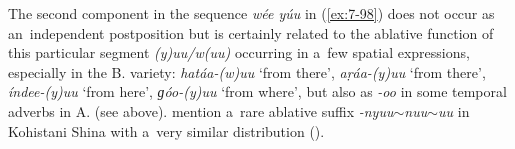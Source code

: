 The second component in the sequence \textit{wée yúu} in (\ref{ex:7-98}) does not occur as an~independent postposition but is certainly related to the ablative function of this particular segment \textit{(y)uu/w(uu)} occurring in a~few spatial expressions, especially in the B. variety: \textit{hatáa-(w)uu} `from there', \textit{aṛáa-(y)uu} `from there', \textit{índee-(y)uu} `from here', \textit{ɡóo-(y)uu} `from where', but also as \textit{-oo} in some temporal adverbs in A. (see  above). \citeauthor{schmidtkohistani2001} mention a~rare ablative suffix \textit{-nyuu$\sim$nuu$\sim$uu} in Kohistani Shina with a~very similar distribution (\citeyear[130]{schmidtkohistani2001}).